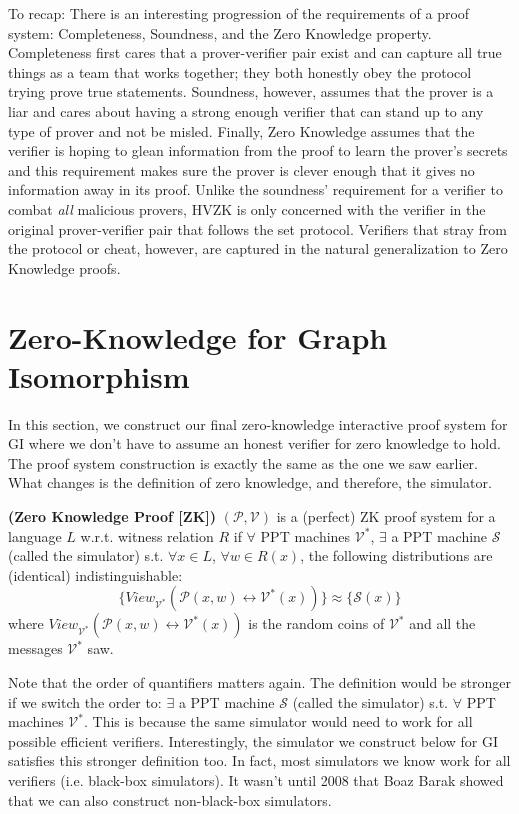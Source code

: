 \documentclass[12pt]{tufte-book}
\begin{document}
To recap: There is an interesting progression of the requirements of a proof system: Completeness, Soundness, and the Zero Knowledge property.  Completeness first cares that a prover-verifier pair exist and can capture all true things as a team that works together; they both honestly obey the protocol trying prove true statements.  Soundness, however, assumes that the prover is a liar and cares about having a strong enough verifier that can stand up to any type of prover and not be misled.  Finally, Zero Knowledge assumes that the verifier is hoping to glean information from the proof to learn the prover's secrets and this requirement makes sure the prover is clever enough that it gives no information away in its proof. Unlike the soundness' requirement for a verifier to combat \textit{all} malicious provers, HVZK is only concerned with the verifier in the original prover-verifier pair that follows the set protocol. Verifiers that stray from the protocol or cheat, however, are captured in the natural generalization to Zero Knowledge proofs.

\section{Zero-Knowledge for Graph Isomorphism}

In this section, we construct our final zero-knowledge interactive proof system for GI where we don't have to assume an honest verifier for zero knowledge to hold. The proof system construction is exactly the same as the one we saw earlier. What changes is the definition of zero knowledge, and therefore, the simulator. 

\begin{definition} {\normalfont\textbf{(Zero Knowledge Proof [ZK])}} 
	$(\mathcal{P},\mathcal{V})$ is a (perfect) ZK proof system for a language $L$ w.r.t. witness relation $R$ if $\forall$ PPT machines $\mathcal{V}^*$,
	$\exists$ a PPT machine $\mathcal{S}$ (called the simulator) s.t. $\forall x \in L$, $\forall w\in R(x)$, the following distributions are (identical) indistinguishable:
$$\{View_{\mathcal{V^*}}(\mathcal{P}(x,w) \leftrightarrow \mathcal{V^*}(x))\} \approx \{\mathcal{S}(x)\}$$
where $View_{\mathcal{V^*}}(\mathcal{P}(x,w) \leftrightarrow \mathcal{V^*}(x))$ is the random coins of $\mathcal{V^*}$ and all the messages $\mathcal{V^*}$ saw.
\end{definition}
\begin{remark}
	Note that the order of quantifiers matters again. The definition would be stronger if we switch the order to: $\exists$ a PPT machine $\mathcal{S}$ (called the simulator) s.t. $\forall$ PPT machines $\mathcal{V}^*$. This is because the same simulator would need to work for all possible efficient verifiers. Interestingly, the simulator we construct below for GI satisfies this stronger definition too. In fact, most simulators we know work for all verifiers (i.e. black-box simulators). It wasn't until 2008 that Boaz Barak showed that we can also construct non-black-box simulators. 
\end{remark}
\end{document}
